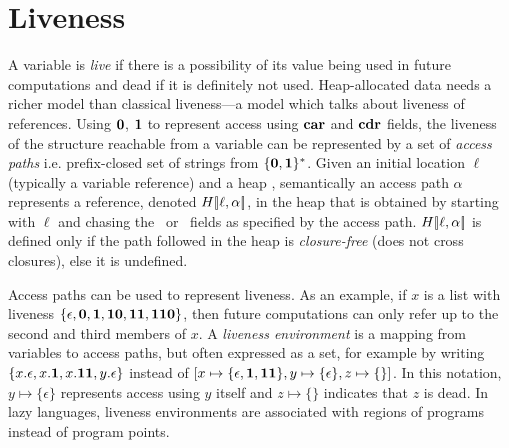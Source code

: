\documentclass[preprint,9pt]{sigplanconf}
\newcommand{\comment}[1]{{\color{Myblue}{#1}}}
\newcommand{\oxlb}{\ensuremath{[\!|}}
\newcommand{\oxrb}{\ensuremath{|\!]}}
\begin{document}
\renewcommand{\pp}[2]{\ensuremath{#1\!\!:\!#2}} %



\section{Liveness}
\label{sec:liveness}

A variable is {\em live} if there  is a possibility of its value being
used in  future computations and  dead if  it is definitely  not used.
Heap-allocated data  needs a richer model  than classical liveness---a
model  which  talks  about  liveness of  references.   Using  $\mathbf{0}$,
$\mathbf{1}$  to  represent access  using  $\mbox{$\mathbf{car}$}$  and $\mbox{$\mathbf{cdr}$}$  fields,  the
liveness of the structure reachable from a variable can be represented
by a set of {\em access paths} i.e.  prefix-closed set of strings from
$\{\mathbf{0},\mathbf{1}\}^\ast$.  Given an initial location $\ell$ (typically a
variable  reference) and  a heap  \heap, semantically  an access  path
$\alpha$ represents  a reference, denoted $\heap\oxlb\ell,  \alpha\oxrb$, in
the heap  that is  obtained by  starting with  $\ell$ and  chasing the
\CAR\ or  \CDR\ fields  as specified  by the  access path.  
$\heap\oxlb\ell, \alpha\oxrb$  is defined only  if the path followed  in the
heap  is \emph{closure-free}  (does not  cross closures),  else it  is
undefined.

Access paths can be used to  represent liveness. As an example, if $x$
is  a  list  with  liveness  $\{\epsilon,  \mathbf{0},  \mathbf{1},  \mathbf{1}\mathbf{0},
\mathbf{1}\mathbf{1},  \mathbf{1}\mathbf{1}\mathbf{0}\}$,  then  future computations  can  only
refer up  to the  second and  third members of  $x$.  A  {\em liveness
  environment} is a mapping from  variables to access paths, but often
expressed as  a set,  for example  by writing  $\{x.\epsilon, x.\mathbf{1},
x.\mathbf{1}\mathbf{1},        y.\epsilon\}$        instead        of        $[x
  \mapsto\{\epsilon,\mathbf{1},\mathbf{1}\mathbf{1}\},          y\mapsto\{\epsilon\},
  z\mapsto\{\}]$.    In  this   notation,  $y   \mapsto  \{\epsilon\}$
represents access using $y$ itself and $z \mapsto \{\}$ indicates that
$z$ is dead.  In lazy  languages, liveness environments are associated
with regions of programs instead of program points.
\end{document}
